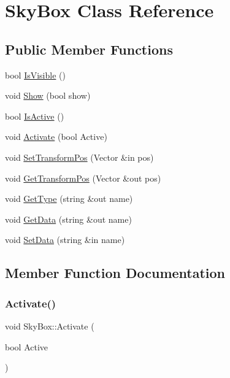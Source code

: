 \hypertarget{class_sky_box}{}\section{Sky\+Box Class Reference}
\label{class_sky_box}
\subsection*{Public Member Functions}
\begin{DoxyCompactItemize}
\item 
bool \hyperlink{class_sky_box_a1fc096488dc4353a798d321efc81933a}{Is\+Visible} ()
\item 
void \hyperlink{class_sky_box_a0e1ed28fb770fe328f5eb65078979c4e}{Show} (bool show)
\item 
bool \hyperlink{class_sky_box_acfbc602464a279bb0dceccaef7a43fd8}{Is\+Active} ()
\item 
void \hyperlink{class_sky_box_aec72b1a687fdc7febb205b437e368305}{Activate} (bool Active)
\item 
void \hyperlink{class_sky_box_a4227939fe4cf35eb866fad263c93ee60}{Set\+Transform\+Pos} (Vector \&in pos)
\item 
void \hyperlink{class_sky_box_aabebff73a8e53c8d42b9ca496f9e2d70}{Get\+Transform\+Pos} (Vector \&out pos)
\item 
void \hyperlink{class_sky_box_a2b8b43680e31680bf9e523d2f1fe68a3}{Get\+Type} (string \&out name)
\item 
void \hyperlink{class_sky_box_a9ad51c899f751e9a985ef738712e4ccc}{Get\+Data} (string \&out name)
\item 
void \hyperlink{class_sky_box_abc8f19d5e30b400659a82c49b83065eb}{Set\+Data} (string \&in name)
\end{DoxyCompactItemize}


\subsection{Member Function Documentation}
\hypertarget{class_sky_box_aec72b1a687fdc7febb205b437e368305}{}\label{class_sky_box_aec72b1a687fdc7febb205b437e368305} 
\subsubsection{\texorpdfstring{Activate()}{Activate()}}
{\footnotesize\ttfamily void Sky\+Box\+::\+Activate (\begin{DoxyParamCaption}\item[{bool}]{Active }\end{DoxyParamCaption})}

